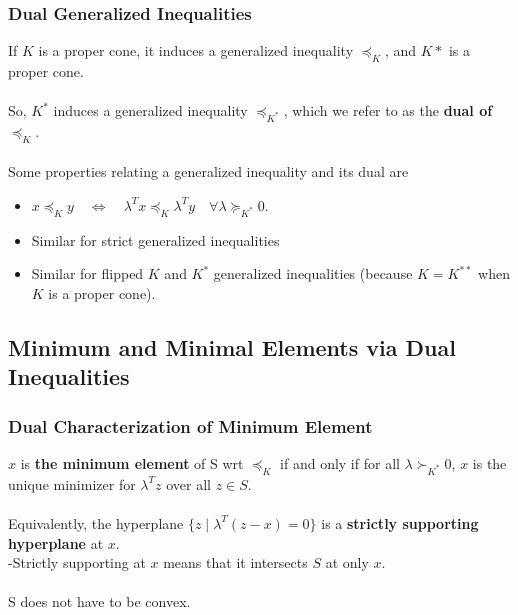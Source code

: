 \documentclass[]{article}
\begin{document}
\subsubsection*{Dual Generalized Inequalities}
If $K$ is a proper cone, it induces a generalized inequality $\preceq_{K}$, and $K*$ is a proper cone.\\\\
So, $K^{*}$ induces a generalized inequality $\preceq_{K^{*}}$, which we refer to as the \textbf{dual of} $\preceq_{K}$. \\\\
Some properties relating a generalized inequality and its dual are
\begin{itemize}
	\item $x \preceq_{K} y \quad \Longleftrightarrow \quad \lambda^{T}x \preceq_{K} \lambda^{T}y \quad \forall \lambda \succeq_{K^{*}} 0.$
	\item Similar for strict generalized inequalities
	\item Similar for flipped $K$ and $K^{*}$ generalized inequalities (because $K=K^{**}$ when $K$ is a proper cone).\\
\end{itemize}

\subsection*{Minimum and Minimal Elements via Dual Inequalities}
\subsubsection*{Dual Characterization of Minimum Element}
$x$ is \textbf{the minimum element} of S wrt $\preceq_{K}$ if and only if for all $\lambda \succ_{K^{*}} 0$, $x$ is the unique minimizer for $\lambda^{T} z$ over all $z \in S$. 
\\\\
Equivalently, the hyperplane $\{z \mid \lambda^{T}(z-x)=0\}$ is a \textbf{strictly supporting hyperplane} at $x$. 
\\
-Strictly supporting at $x$ means that it intersects $S$ at only $x$. 
\\\\
S does not have to be convex. 
\\
\end{document}
